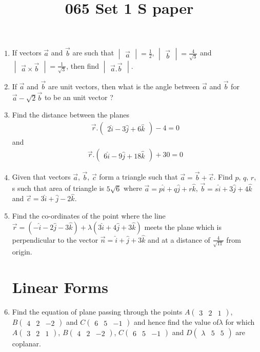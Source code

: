 \documentclass[12pt,-letter paper]{article}
\title{065 Set 1 S paper}
\newcommand{\myvec}[1]{\ensuremath{\begin{pmatrix}#1\end{pmatrix}}}
\newcommand{\mydet}[1]{\ensuremath{\begin{vmatrix}#1\end{vmatrix}}}
\begin{document}

\begin{enumerate}

\section{Vectors}
	\item If vectors $\overrightarrow{a}$ and $\overrightarrow{b}$ are such that
 $\mydet{\overrightarrow{a}} = \frac{1}{2}$, $\mydet{\overrightarrow{b}} = \frac{4}{\sqrt{3}}$
 and $\mydet{\overrightarrow{a} \times \overrightarrow{b}} = \frac{1}{\sqrt{3}}$, then find 
 $\mydet{\overrightarrow{a}.\overrightarrow{b}}$.

	\item If $\overrightarrow{a}$ and $\overrightarrow{b}$ are unit vectors, then what is the angle between 
$\overrightarrow{a}$ and $\overrightarrow{b}$ for $\overrightarrow{a} - \sqrt{2}\overrightarrow{b}$ to be an unit vector ?
	
	\item Find the distance between the planes 
		\begin{align}
			\overrightarrow{r}.\myvec{2\hat{i}-3\hat{j}+6\hat{k} } - 4 =0
		\end{align}
	and 
		\begin{align}
			\overrightarrow{r}.\myvec{6\hat{i}-9\hat{j} +18\hat{k}} +30 =0
		\end{align}

	\item Given that vectors $\overrightarrow{a}$, $\overrightarrow{b}$, $\overrightarrow{c}$ form a triangle such that 
$\overrightarrow{a} = \overrightarrow{b}+\overrightarrow{c}$. Find $p$, $q$, $r$, s such that area of triangle is $5\sqrt{6}$ where $\overrightarrow{a} = p\hat{i} +q\hat{j}+r\hat{k}$, 
$\overrightarrow{b} = s\hat{i} +3\hat{j}+4\hat{k}$ and $\overrightarrow{c}=3\hat{i} +\hat{j}-2\hat{k}$.
	
	\item Find the co-ordinates of the point where the line $\overrightarrow{r}=(-\hat{i}-2\hat{j}-3\hat{k})+\lambda(3\hat{i} +4\hat{j}+3\hat{k})$ meets the plane which is perpendicular to the vector $\overrightarrow{n}=\hat{i}+\hat{j} +3\hat{k}$ and at a distance of
$\frac{4}{\sqrt{11}}$ from origin.

\section{Linear Forms}
	\item Find the equation of plane passing through the points $A\myvec{3 & 2 & 1}$,
$B\myvec{4 & 2 & -2}$ and $C\myvec{6 & 5 & -1}$ and hence find the value of$\lambda$ for which 
$A\myvec{3 & 2 & 1}$, $B\myvec{4 & 2 & -2}$, $C\myvec{6 & 5 & -1}$ and $D\myvec{\lambda & 5 & 5}$
are coplanar.


\end{enumerate}
\end{document}

